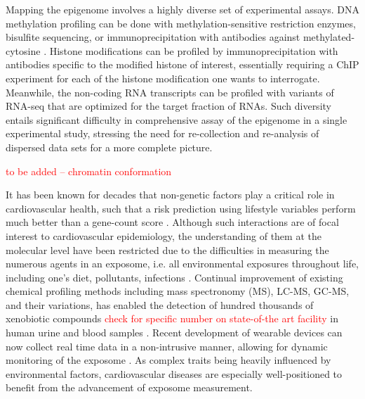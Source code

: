 \documentclass[letter]{bioinfo}
\newcommand{\comment}[1]{\textcolor{red}{#1}}
\begin{document}
	Mapping the epigenome involves a highly diverse set of experimental assays. DNA methylation profiling can be done with methylation-sensitive restriction enzymes, bisulfite sequencing, or immunoprecipitation with antibodies against  methylated-cytosine \citep{Bibikova:2010:Genomewide}. Histone modifications can be profiled by immunoprecipitation with antibodies specific to the modified histone of interest, essentially requiring a ChIP experiment for each of the histone modification one wants to interrogate. Meanwhile, the non-coding RNA transcripts can be profiled with variants of RNA-seq that are optimized for the target fraction of RNAs. Such diversity entails significant difficulty in comprehensive assay of the epigenome in a single experimental study, stressing the need for re-collection and re-analysis of dispersed data sets for a more complete picture.
	
	
	
	
	\comment{to be added -- chromatin conformation \citep{Rosa-Garrido:2017:HighResolution}}
	
	
	It has been known for decades that non-genetic factors play a critical role in cardiovascular health, such that a risk prediction using lifestyle variables perform much better than a gene-count score \citep{Joyner:2011:Ten}. Although such interactions are of focal interest to cardiovascular epidemiology,  the understanding of them at the molecular level have been restricted due to the difficulties in measuring the numerous agents in an exposome, i.e. all environmental exposures throughout life, including one's diet, pollutants, infections \citep{Wild:2005:Complementing}. Continual improvement of existing chemical profiling methods including mass spectronomy (MS), LC-MS, GC-MS, and their variations, has enabled the detection of hundred thousands of xenobiotic compounds \comment{check for specific number on state-of-the art facility} in human urine and blood samples \citep{Warth:2017:ExposomeScale}.
	Recent development of wearable devices can now collect real time data in a non-intrusive manner, allowing for dynamic monitoring of the exposome \citep{Jiang:2018:Dynamic}. As complex traits being heavily influenced by environmental factors, cardiovascular diseases are especially well-positioned to benefit from the advancement of exposome measurement.
	
\end{document}
